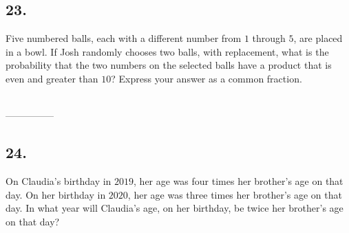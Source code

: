 \documentclass[12pt]{article}
\newenvironment{answer}{\vspace{1em}}{}
\newenvironment{answer}{\vspace{0em}\expandafter\comment}{\expandafter\endcomment}
\newlength{\currentparskip}
\newlength{\currentparindent}
\newenvironment{minipagex}[2][]
  {\setlength{\currentparskip}{\parskip}%
    \setlength{\currentparindent}{\parindent}%
   \begin{minipage}[#1]{#2}%
   \setlength{\parskip}{\currentparskip}%
   \setlength{\parindent}{\currentparindent}%
  }
  {\end{minipage}}
\begin{document}
\subsection*{23.}
Five numbered balls, each with a different number from $1$ through $5$, are placed in a bowl. If Josh randomly chooses two balls, with replacement, what is the probability that the two numbers on the selected balls have a product that is even and greater than $10$? Express your answer as a common fraction. 

\fbox{\phantom{ANSWER}}\\
\mbox{---------------}\\
\fbox{\phantom{ANSWER}}

\begin{answer}
%
\end{answer}


\subsection*{24.}
On Claudia's birthday in $2019$, her age was four times her brother's age on that day. On her birthday in $2020$, her age was three times her brother's age on that day. In what year will Claudia's age, on her birthday, be twice her brother's age on that day?

\fbox{\phantom{ANSWER}}
\end{document}
